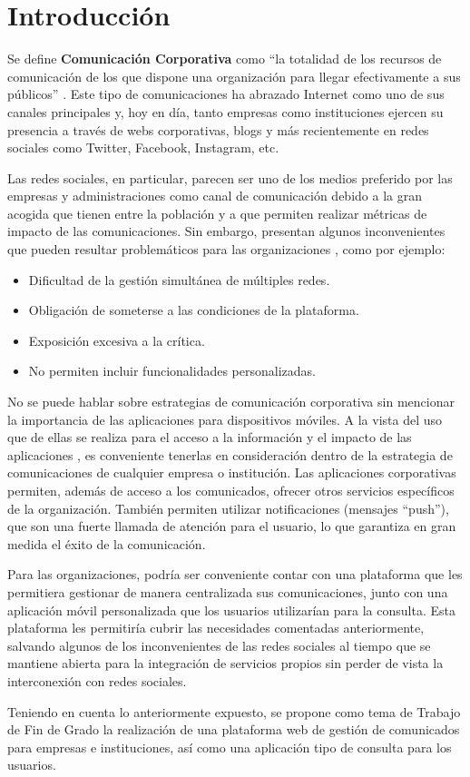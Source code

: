 \chapter{Introducción}
Se define \textbf{Comunicación Corporativa} como ``la totalidad de los recursos de comunicación de los que dispone una organización para llegar efectivamente a sus públicos'' \cite{riel_2001}. Este tipo de comunicaciones ha abrazado Internet como uno de sus canales principales y, hoy en día, tanto empresas como instituciones ejercen su presencia a través de webs corporativas, blogs y más recientemente en redes sociales como Twitter, Facebook, Instagram, etc.

Las redes sociales, en particular, parecen ser uno de los medios preferido por las empresas \cite{linkedin} y administraciones \cite{grande2015casos} como canal de comunicación debido a la gran acogida que tienen entre la población y a que permiten realizar métricas de impacto de las comunicaciones. Sin embargo, presentan algunos inconvenientes que pueden resultar problemáticos para las organizaciones \cite{nadaraja2013socialmediamarketing}, como por ejemplo:
\begin{itemize}
    \item Dificultad de la gestión simultánea de múltiples redes.
    \item Obligación de someterse a las condiciones de la plataforma.
    \item Exposición excesiva a la crítica.
    \item No permiten incluir funcionalidades personalizadas.
\end {itemize}

No se puede hablar sobre estrategias de comunicación corporativa sin mencionar la importancia de las aplicaciones para dispositivos móviles. A la vista del uso que de ellas se realiza para el acceso a la información y el impacto de las aplicaciones \cite{playstore} \cite{appstore}, es conveniente tenerlas en consideración dentro de la estrategia de comunicaciones de cualquier empresa o institución. Las aplicaciones corporativas permiten, además de acceso a los comunicados, ofrecer otros servicios específicos de la organización. También permiten utilizar notificaciones (mensajes ``push''), que son una fuerte llamada de atención para el usuario, lo que garantiza en gran medida el éxito de la comunicación.

Para las organizaciones, podría ser conveniente contar con una plataforma que les permitiera gestionar de manera centralizada sus comunicaciones, junto con una aplicación móvil personalizada que los usuarios utilizarían para la consulta. Esta plataforma les permitiría cubrir las necesidades comentadas anteriormente, salvando algunos de los inconvenientes de las redes sociales al tiempo que se mantiene abierta para la integración de servicios propios sin perder de vista la interconexión con redes sociales.

Teniendo en cuenta lo anteriormente expuesto, se propone como tema de Trabajo de Fin de Grado la realización de una plataforma web de gestión de comunicados para empresas e instituciones, así como una aplicación tipo de consulta para los usuarios.